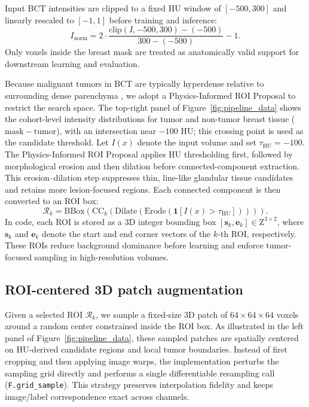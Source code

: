\documentclass{iopjournal}
\begin{document}
Input BCT intensities are clipped to a fixed HU window of $[-500, 300]$ and linearly rescaled to $[-1,1]$ before training and inference:
\begin{equation}
I_{\mathrm{norm}} = 2\cdot \frac{\mathrm{clip}(I,-500,300)-(-500)}{300-(-500)} - 1.
\end{equation}
Only voxels inside the breast mask are treated as anatomically valid support for downstream learning and evaluation.

Because malignant tumors in BCT are typically hyperdense relative to surrounding dense parenchyma \cite{weber2024potential}, we adopt a Physics-Informed ROI Proposal to restrict the search space. The top-right panel of Figure~\ref{fig:pipeline_data} shows the cohort-level intensity distributions for tumor and non-tumor breast tissue ($\mathrm{mask}-\mathrm{tumor}$), with an intersection near $-100$ HU; this crossing point is used as the candidate threshold. Let $I(x)$ denote the input volume and set $\tau_{\mathrm{HU}}=-100$. The Physics-Informed ROI Proposal applies HU thresholding first, followed by morphological erosion and then dilation before connected-component extraction. This erosion--dilation step suppresses thin, line-like glandular tissue candidates and retains more lesion-focused regions. Each connected component is then converted to an ROI box:
\begin{equation}
\mathcal{R}_k = \mathrm{BBox}\left(\mathrm{CC}_k\left(\mathrm{Dilate}\left(\mathrm{Erode}\left(\mathbf{1}[I(x) > \tau_{\mathrm{HU}}]\right)\right)\right)\right).
\end{equation}
In code, each ROI is stored as a 3D integer bounding box $[\mathbf{s}_k,\mathbf{e}_k]\in\mathrm{Z}^{3\times 2}$, where $\mathbf{s}_k$ and $\mathbf{e}_k$ denote the start and end corner vectors of the $k$-th ROI, respectively. These ROIs reduce background dominance before learning and enforce tumor-focused sampling in high-resolution volumes. 

\subsection{ROI-centered 3D patch augmentation}
Given a selected ROI $\mathcal{R}_k$, we sample a fixed-size 3D patch of 64\,$\times$\,64\,$\times$\,64 voxels around a random center constrained inside the ROI box. As illustrated in the left panel of Figure~\ref{fig:pipeline_data}, these sampled patches are spatially centered on HU-derived candidate regions and local tumor boundaries. Instead of first cropping and then applying image warps, the implementation perturbs the sampling grid directly and performs a single differentiable resampling call (\texttt{F.grid\_sample}). This strategy preserves interpolation fidelity and keeps image/label correspondence exact across channels.
\end{document}
